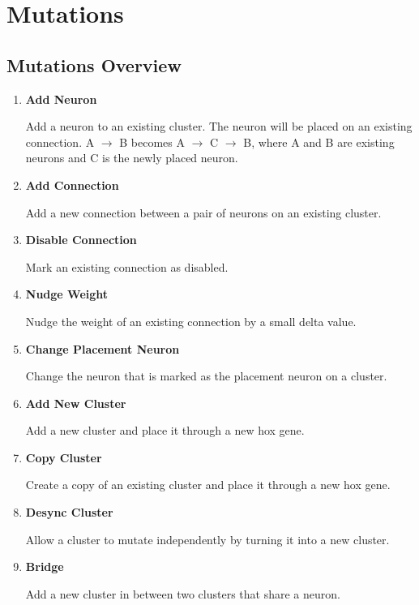 \newpage
\section{Mutations}

\subsection{Mutations Overview}

\begin{enumerate}\itemsep0pt
	\item \textbf{Add Neuron}
	
	Add a neuron to an existing cluster. The neuron will be placed on an existing connection.  
	A $\rightarrow$ B becomes A $\rightarrow$ C $\rightarrow$ B, where A and B are existing neurons and C is the newly placed neuron.
	
	\item \textbf{Add Connection}
	
	Add a new connection between a pair of neurons on an existing cluster.
	
	\item \textbf{Disable Connection}
	
	Mark an existing connection as disabled.
	
	\item \textbf{Nudge Weight}
	
	Nudge the weight of an existing connection by a small delta value.
	
	\item \textbf{Change Placement Neuron}
	
	Change the neuron that is marked as the placement neuron on a cluster.
	
	\item \textbf{Add New Cluster}
	
	Add a new cluster and place it through a new hox gene.
	
	\item \textbf{Copy Cluster}
	
	Create a copy of an existing cluster and place it through a new hox gene.
	
	\item \textbf{Desync Cluster}
	
	Allow a cluster to mutate independently by turning it into a new cluster.
	
	\item \textbf{Bridge}
	
	Add a new cluster in between two clusters that share a neuron.
	

\end{enumerate}
